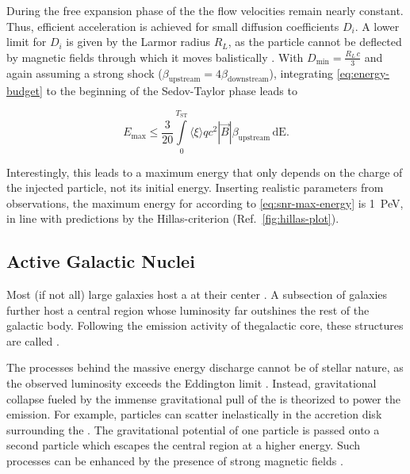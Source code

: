During the free expansion phase of the \SNR the flow velocities remain nearly 
constant. Thus, efficient acceleration is achieved for small diffusion 
coefficients $D_i$. A lower limit for $D_i$ is given by the Larmor radius 
$R_L$, as the particle cannot be deflected by magnetic fields through which 
it moves balistically \cite{lagageMaximumEnergyCosmic1983}. With 
$D_\mathrm{min} = \frac{R_L\,c}{3}$ and again assuming a strong shock 
($\beta_\mathrm{upstream} = 4\beta_\mathrm{downstream}$), integrating 
\cref{eq:energy-budget} to the beginning of the Sedov-Taylor phase leads to

\begin{equation}
\label{eq:snr-max-energy}
E_\mathrm{max} \leq \frac{3}{20} \int\limits_0^{T_\mathrm{ST}}\langle\xi\rangle q c^2 \left|\vec{B}\right| \beta_\mathrm{upstream}\, \mathrm{dE}.
\end{equation}

Interestingly, this leads to a maximum energy that only depends on the charge 
of the injected particle, not its initial energy. Inserting realistic 
parameters from observations, the maximum energy for \SNRs according to 
\cref{eq:snr-max-energy} is \SI{1}{\peta\eV}, in line with  predictions by the 
Hillas-criterion (Ref.\ \cref{fig:hillas-plot}).

\subsection{Active Galactic Nuclei}
\label{ssec:active-galactic-nuclei}

Most (if not all) large galaxies host a \SMBH at their center
\cite{kormendyInwardBoundSearch1995, kormendyCoevolutionNotSupermassive2013}. 
A subsection of galaxies further host a central region whose luminosity far 
outshines the rest of the galactic body. Following the emission activity of thegalactic core, these structures are called \AGNs.

The processes behind the massive energy discharge cannot be of stellar nature,
as the observed luminosity exceeds the Eddington limit 
\cite{rybickiRadiativeProcessesAstrophysics2024}. Instead, gravitational 
collapse fueled by the immense gravitational pull of the \SMBH is theorized to 
power the emission. For example, particles can scatter inelastically in the 
accretion disk surrounding the \SMBH. The gravitational potential of one 
particle is passed onto a second particle which escapes the central region at a
higher energy. Such processes can be enhanced by the presence of strong 
magnetic fields \cite{piotrovichDeterminationMagneticField2020}.
 

